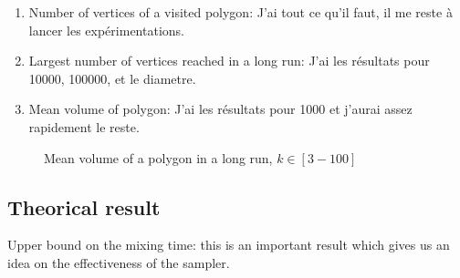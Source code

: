 \documentclass[a4paper]{article}
\begin{document}
\begin{enumerate}
  \item Number of vertices of a visited polygon: J'ai tout ce qu'il faut, il me reste à lancer les expérimentations.

  \item Largest number of vertices reached in a long run: J'ai les résultats pour 10000, 100000, et le diametre.

  \item Mean volume of polygon: J'ai les résultats pour 1000 et j'aurai assez rapidement le reste.
\end{enumerate}

\begin{figure}
  \begin{center}
    \begin{minipage}[c]{.4\linewidth}
      \resizebox{\columnwidth}{!}{}
    \end{minipage}
    \begin{minipage}[c]{.4\linewidth}
      \resizebox{\columnwidth}{!}{}
    \end{minipage}
    \caption{Mean volume of a polygon in a long run, $k \in [3-100]$}
    \label{10krun}
  \end{center}
\end{figure}

\subsection*{Theorical result}
Upper bound on the mixing time: this is an important result which gives us an idea on the effectiveness of the sampler.
\end{document}
